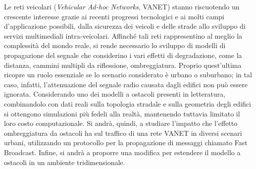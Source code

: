 
Le reti veicolari (\textit{Vehicular Ad-hoc Networks}, VANET) stanno riscuotendo un crescente interesse
grazie ai recenti progressi tecnologici e ai molti campi d'applicazione possibili, dalla sicurezza dei veicoli
e delle strade allo sviluppo di servizi multimediali intra-veicolari.
Affinché tali reti rappresentino al meglio la complessità del mondo reale, si rende necessario lo sviluppo di modelli di propagazione del segnale
che considerino i vari effetti di degradazione, come la distanza, cammini multipli da riflessione, ombreggiatura.
Proprio quest'ultima ricopre un ruolo essenziale se lo scenario considerato è urbano o suburbano; in tal caso, infatti,
l'attenuazione del segnale radio causata dagli edifici non può essere ignorata.
Considerando uno dei modelli a ostacoli presenti in letteratura,
combinandolo con dati reali sulla topologia stradale e sulla geometria degli edifici
si ottengono simulazioni più fedeli alla realtà, mantenendo tuttavia limitato il loro costo computazionale.
Si andrà, quindi, a studiare l'impatto che l'effetto ombreggiatura da ostacoli ha sul traffico
di una rete VANET in diversi scenari urbani,
utilizzando un protocollo per la propagazione di messaggi chiamato Fast Broadcast.
Infine, si andrà a proporre una modifica per estendere il modello a ostacoli in un ambiente tridimensionale.
%
